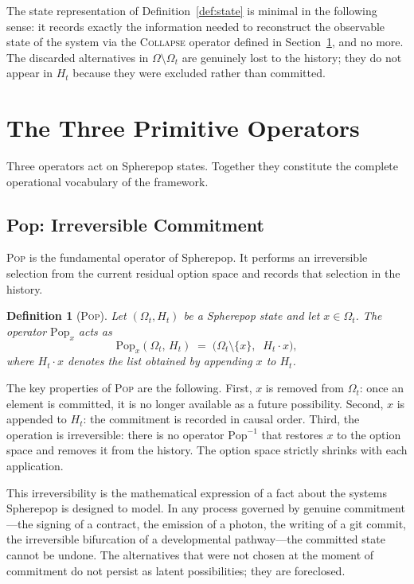 \documentclass[12pt]{article}
\newtheorem{definition}{Definition}[section]
\begin{document}
The state representation of Definition~\ref{def:state} is minimal in the following sense: it records exactly the information needed to reconstruct the observable state of the system via the \textsc{Collapse} operator defined in Section~\ref{sec:operators}, and no more. The discarded alternatives in $\Omega \setminus \Omega_t$ are genuinely lost to the history; they do not appear in $H_t$ because they were excluded rather than committed.

\section{The Three Primitive Operators}
\label{sec:operators}

Three operators act on Spherepop states. Together they constitute the complete operational vocabulary of the framework.

\subsection{Pop: Irreversible Commitment}

\textsc{Pop} is the fundamental operator of Spherepop. It performs an irreversible selection from the current residual option space and records that selection in the history.

\begin{definition}[\textsc{Pop}]
Let $(\Omega_t, H_t)$ be a Spherepop state and let $x \in \Omega_t$. The operator $\mathrm{Pop}_x$ acts as
\[
\mathrm{Pop}_x(\Omega_t,\, H_t) \;=\; \bigl(\Omega_t \setminus \{x\},\;\; H_t \cdot x\bigr),
\]
where $H_t \cdot x$ denotes the list obtained by appending $x$ to $H_t$.
\end{definition}

The key properties of \textsc{Pop} are the following. First, $x$ is removed from $\Omega_t$: once an element is committed, it is no longer available as a future possibility. Second, $x$ is appended to $H_t$: the commitment is recorded in causal order. Third, the operation is irreversible: there is no operator $\mathrm{Pop}^{-1}$ that restores $x$ to the option space and removes it from the history. The option space strictly shrinks with each application.

This irreversibility is the mathematical expression of a fact about the systems Spherepop is designed to model. In any process governed by genuine commitment---the signing of a contract, the emission of a photon, the writing of a git commit, the irreversible bifurcation of a developmental pathway---the committed state cannot be undone. The alternatives that were not chosen at the moment of commitment do not persist as latent possibilities; they are foreclosed.
\end{document}

